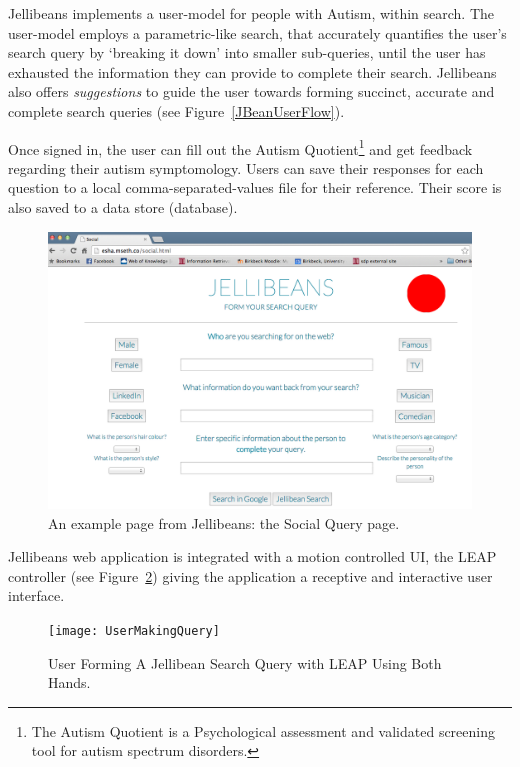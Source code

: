 \documentclass[a4paper, 11pt]{article}
\begin{document}
Jellibeans implements a user-model for people with Autism, within search. The user-model employs a parametric-like search, that accurately quantifies the user's search query by `breaking it down' into smaller sub-queries, until the user has exhausted the information they can provide to complete their search. Jellibeans also offers \textit{suggestions} to guide the user towards forming succinct, accurate and complete search queries (see Figure~\ref{JBeanUserFlow}).

\vspace{5mm} 
Once signed in, the user can fill out the Autism Quotient\footnote{The Autism Quotient \cite{Baron Cohen et al} is a Psychological assessment and validated screening tool for autism spectrum disorders.} and get feedback regarding their autism symptomology. Users can save their responses for each question to a local comma-separated-values file for their reference. Their score is also saved to a data store (database).

\begin{figure}[H]
\begin{center}
\includegraphics[scale=0.25]{SocialPage}
\end{center}
\caption{An example page from Jellibeans: the Social Query page.}
\label{SocialPage}
\end{figure}


Jellibeans web application is integrated with a motion controlled UI, the LEAP controller (see Figure~\ref{UserMakingQuery}) giving the application a receptive and interactive user interface.

\begin{figure}[H]
\begin{center}
\texttt{[image: UserMakingQuery]}
\caption{User Forming A Jellibean Search Query with LEAP Using Both Hands.}
\label{UserMakingQuery}
\end{center}
\end{figure}
\end{document}
